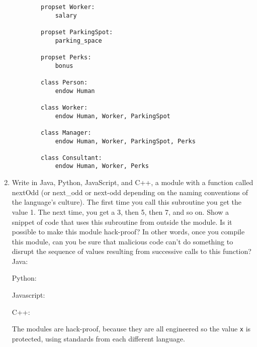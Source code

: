 \documentclass{article}
\begin{document}
\begin{enumerate}
\begin{verbatim}
        propset Worker:
            salary

        propset ParkingSpot:
            parking_space

        propset Perks:
            bonus

        class Person:
            endow Human

        class Worker:
            endow Human, Worker, ParkingSpot

        class Manager:
            endow Human, Worker, ParkingSpot, Perks

        class Consultant:
            endow Human, Worker, Perks
    \end{verbatim}
    \pagebreak
    \item Write in Java, Python, JavaScript, and C++, a module with a function called nextOdd (or next\_odd or next-odd depending on the naming conventions of the language's culture). The first time you call this subroutine you get the value 1. The next time, you get a 3, then 5, then 7, and so on. Show a snippet of code that uses this subroutine from outside the module. Is it possible to make this module hack-proof? In other words, once you compile this module, can you be sure that malicious code can't do something to disrupt the sequence of values resulting from successive calls to this function? \\
    \linebreak
    Java:
    
    Python:
    
    Javascript:
    
    C++:
    
    The modules are hack-proof, because they are all engineered so the value \texttt{x} is protected, using standards from each different language.
\end{enumerate}
\end{document}
